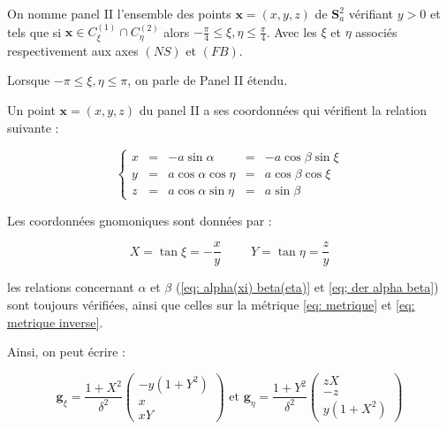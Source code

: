 \begin{definition}
On nomme panel II l'ensemble des points $\mathbf{x}=(x,y,z)$ de $\mathbf{S}_a^2$ vérifiant $y>0$ et tels que si $\mathbf{x} \in C_{\xi}^{(1)} \cap C_{\eta}^{(2)}$ alors $-\frac{\pi}{4}\leq \xi,\eta \leq \frac{\pi}{4}$. Avec les $\xi$ et $\eta$ associés respectivement aux axes $(NS)$ et $(FB)$.

Lorsque $-\pi \leq \xi,\eta \leq \pi$, on parle de Panel II étendu.
\end{definition}

Un point $\mathbf{x}=(x,y,z)$ du panel II a ses coordonnées qui vérifient la relation suivante :

\begin{equation}
\left\lbrace
\begin{array}{rcccc}
x & = & - a \sin \alpha & = & - a \cos \beta \sin \xi \\
y & = & a \cos \alpha \cos \eta & = & a \cos \beta \cos \xi \\
z & = & a \cos \alpha \sin \eta & = & a \sin \beta
\end{array}
\right.
\end{equation}

Les coordonnées gnomoniques sont données par :

\begin{equation}
X = \tan \xi = - \dfrac{x}{y} \hspace{1cm} Y = \tan \eta = \dfrac{z}{y}
\end{equation}

les relations concernant $\alpha$ et $\beta$ (\eqref{eq: alpha(xi) beta(eta)} et \eqref{eq; der alpha beta}) sont toujours vérifiées, ainsi que celles sur la métrique \eqref{eq: metrique} et \eqref{eq: metrique inverse}.

Ainsi, on peut écrire : 

\begin{equation}
\mathbf{g}_{\xi} = \dfrac{1+X^2}{\delta^2} \begin{pmatrix}
-y(1+Y^2) \\ x \\ xY
\end{pmatrix} \text{ et } \mathbf{g}_{\eta} = \dfrac{1+Y^2}{\delta^2} \begin{pmatrix}
zX \\ -z \\ y(1+X^2)
\end{pmatrix}
\label{eq: base locale II}
\end{equation}

